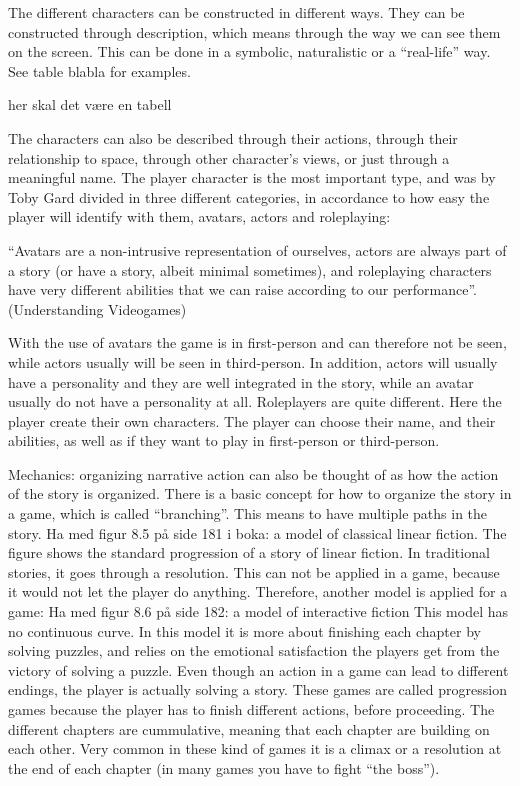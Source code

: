 The different characters can be constructed in different ways. They can be constructed through description, which means through the way we can see them on the screen. This can be done in a symbolic, naturalistic or a “real-life” way. See table blabla for examples.

her skal det være en tabell

The characters can also be described through their actions, through their relationship to space, through other character’s views, or just through a meaningful name. The player character is the most important type, and was by Toby Gard divided in three different categories, in accordance to how easy the player will identify with them, avatars, actors and roleplaying: 

“Avatars are a non-intrusive representation of ourselves, actors are always part of a story (or have a story, albeit minimal sometimes), and roleplaying characters have very different abilities that we can raise according to our performance”. (Understanding Videogames) 

With the use of avatars the game is in first-person and can therefore not be seen, while actors usually will be seen in third-person. In addition, actors will usually have a personality and they are well integrated in the story, while an avatar usually do not have a personality at all. Roleplayers are quite different. Here the player create their own characters. The player can choose their name, and their abilities, as well as if they want to play in first-person or third-person.  

Mechanics: organizing narrative action can also be thought of as how the action of the story is organized. There is a basic concept for how to organize the story in a game, which is called “branching”. This means to have multiple paths in the story. 
Ha med figur 8.5 på side 181 i boka: a model of classical linear fiction. 
The figure shows the standard progression of a story of linear fiction. In traditional stories, it goes through a resolution. This can not be applied in a game, because it would not let the player do anything. Therefore, another model is applied for a game:
Ha med figur 8.6 på side 182: a model of interactive fiction
This model has no continuous curve. In this model it is more about finishing each chapter by solving puzzles, and relies on the emotional satisfaction the players get from the victory of solving a puzzle. Even though an action in a game can lead to different endings, the player is actually solving a story. These games are called progression games because the player has to finish different actions, before proceeding. The different chapters are cummulative, meaning that each chapter are building on each other. Very common in these kind of games it is a climax or a resolution at the end of each chapter (in many games you have to fight “the boss”). 

